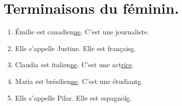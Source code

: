 \section{Terminaisons du féminin.}
\begin{enumerate}
    \item Émilie est canadien\underline{ne}. C'est une journaliste.
    \item Elle s'appelle Justine. Elle est français\underline{e}.
    \item Claudia est italien\underline{ne}. C'est une act\underline{rice}.
    \item Maria est brésilien\underline{ne}. C'est une étudiant\underline{e}.
    \item Elle s'appelle Pilar. Elle est espagnol\underline{e}.
\end{enumerate}